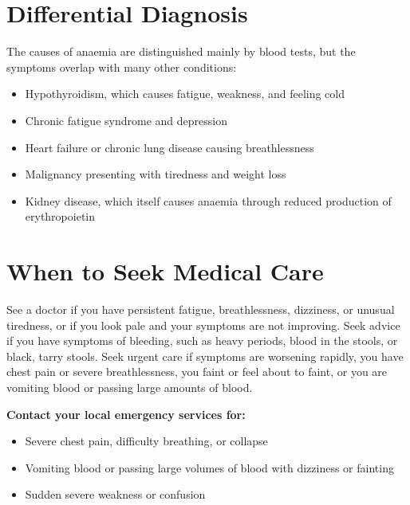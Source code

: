 \section*{Differential Diagnosis}
The causes of anaemia are distinguished mainly by blood tests, but the symptoms overlap with many other conditions:
\begin{itemize}
    \item Hypothyroidism, which causes fatigue, weakness, and feeling cold
    \item Chronic fatigue syndrome and depression
    \item Heart failure or chronic lung disease causing breathlessness
    \item Malignancy presenting with tiredness and weight loss
    \item Kidney disease, which itself causes anaemia through reduced production of erythropoietin
\end{itemize}

\section*{When to Seek Medical Care}
See a doctor if you have persistent fatigue, breathlessness, dizziness, or unusual tiredness, or if you look pale and your symptoms are not improving. Seek advice if you have symptoms of bleeding, such as heavy periods, blood in the stools, or black, tarry stools. Seek urgent care if symptoms are worsening rapidly, you have chest pain or severe breathlessness, you faint or feel about to faint, or you are vomiting blood or passing large amounts of blood.

\textbf{Contact your local emergency services for:}
\begin{itemize}
    \item Severe chest pain, difficulty breathing, or collapse
    \item Vomiting blood or passing large volumes of blood with dizziness or fainting
    \item Sudden severe weakness or confusion
\end{itemize}

